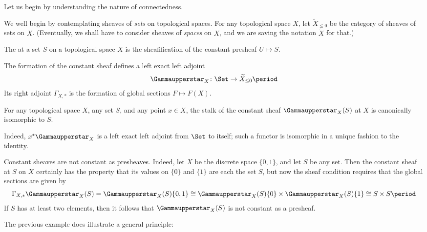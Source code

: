 Let us begin by understanding the nature of connectedness.

\begin{ntn}
	We well begin by contemplating sheaves of \emph{sets} on topological spaces.
	For any topological space $ X $, let $ \widetilde{X}_{\leq 0} $ be the category of sheaves of sets on $ X $.
	(Eventually, we shall have to consider sheaves of \emph{spaces} on $ X $, and we are saving the notation $ \widetilde{X} $ for that.)
\end{ntn}

\begin{dfn}
	The  at a set $ S $ on a topological space $ X $ is the sheafification of the constant presheaf $ U \mapsto S $.
\end{dfn}

\begin{nul}
	The formation of the constant sheaf defines a left exact left adjoint
	\[
		\Gammaupperstar_X \colon \Set \to \widetilde{X}_{\leq 0} \period
	\]
	Its right adjoint $ \Gamma_{X, \ast} $ is the formation of global sections $ F \mapsto F(X) $.
\end{nul}

\begin{nul}
	For any topological space $ X $, any set $ S $, and any point $ x \in X $, the stalk of the constant sheaf $ \Gammaupperstar_X (S) $ at $ X $ is canonically isomorphic to $ S $.

	Indeed, $ x^{\ast} \Gammaupperstar_X $ is a left exact left adjoint from $ \Set $ to itself;
	such a functor is isomorphic in a unique fashion to the identity.
\end{nul}

\begin{exm}
	Constant sheaves are not constant as presheaves.
	Indeed, let $ X $ be the discrete space $ \{ 0, 1 \} $, and let $ S $ be any set.
	Then the constant sheaf at $ S $ on $ X $ certainly has the property that its values on $ \{ 0 \} $ and $ \{ 1 \} $ are each the set $ S $, but now the sheaf condition requires that the global sections are given by
	\[
		\Gamma_{X, \ast} \Gammaupperstar_X (S) = \Gammaupperstar_X (S) \{0,1\} \cong \Gammaupperstar_X (S) \{ 0 \} \times \Gammaupperstar_X (S) \{ 1 \} \cong S \times S \period
	\]
	If $ S $ has at least two elements, then it follows that $ \Gammaupperstar_X (S) $ is not constant as a presheaf.
\end{exm}

The previous example does illustrate a general principle:

